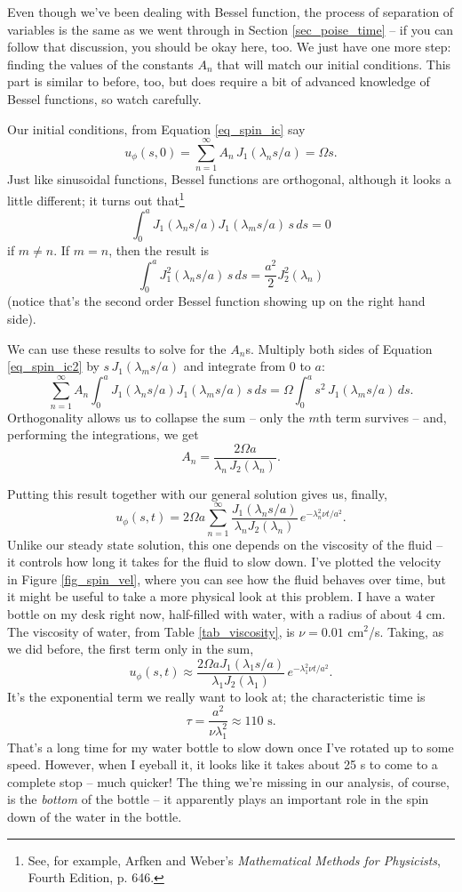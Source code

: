 Even though we've been dealing with Bessel function, the process of separation of variables is the same as we went through in Section \ref{sec_poise_time} -- if you can follow that discussion, you should be okay here, too.  We just have one more step:  finding the values of the constants $A_n$ that will match our initial conditions.  This part is similar to before, too, but does require a bit of advanced knowledge of Bessel functions, so watch carefully.

Our initial conditions, from Equation \ref{eq_spin_ic} say
\begin{equation}
\label{eq_spin_ic2}
u_\phi(s,0) =  \sum_{n=1}^\infty A_n \, J_1(\lambda_n s / a) = \Omega s.
\end{equation}
Just like sinusoidal functions, Bessel functions are orthogonal, although it looks a little different; it turns out that\footnote{See, for example, Arfken and Weber's \emph{Mathematical Methods for Physicists}, Fourth Edition, p. 646.}
\[
\int_0^a J_1(\lambda_n s / a) J_1(\lambda_m s /a) \, s\, ds = 0
\]
if $m \neq n$.  If $m = n$, then the result is
\[
\int_0^a J_1^2(\lambda_n s / a) \, s \, ds = \frac{a^2}{2} J_2^2(\lambda_n)
\]
(notice that's the second order Bessel function showing up on the right hand side).

We can use these results to solve for the $A_n$s.  Multiply both sides of Equation \ref{eq_spin_ic2} by $s \, J_1(\lambda_m s /a)$ and integrate from $0$ to $a$:
\[
\sum_{n=1}^\infty A_n \int_0^a J_1(\lambda_n s / a) J_1(\lambda_m s /a) \, s\, ds = \Omega \int_0^a s^2 \, J_1(\lambda_m s/a) \, ds.
\]
Orthogonality allows us to collapse the sum -- only the $m$th term survives -- and, performing the integrations, we get
\[
A_n = \frac{2 \Omega a}{\lambda_n \, J_2(\lambda_n)}.
\]

Putting this result together with our general solution gives us, finally,
\begin{equation}
u_\phi(s, t) = 2\Omega a \sum_{n=1}^\infty \frac{J_1(\lambda_n s/a)}{\lambda_n J_2(\lambda_n)} \, e^{-\lambda_n^2 \nu t / a^2}.
\end{equation}
Unlike our steady state solution, this one depends on the viscosity of the fluid -- it controls how long it takes for the fluid to slow down.  I've plotted the velocity in Figure \ref{fig_spin_vel}, where you can see how the fluid behaves over time, but it might be useful to take a more physical look at this problem.  I have a water bottle on my desk right now, half-filled with water, with a radius of about $4$ cm.  The viscosity of water, from Table \ref{tab_viscosity}, is $\nu = 0.01$ cm$^2$/s.  Taking, as we did before, the first term only in the sum, 
\[
u_\phi(s, t) \approx \frac{2\Omega a J_1(\lambda_1 s/a)}{\lambda_1 J_2(\lambda_1)} \, e^{-\lambda_1^2 \nu t / a^2}.
\]
It's the exponential term we really want to look at; the characteristic time is
\[
\tau = \frac{a^2}{\nu \lambda_1^2} \approx 110 \text{ s}.
\]
That's a long time for my water bottle to slow down once I've rotated up to some speed.  However, when I eyeball it, it looks like it takes about 25 s to come to a complete stop -- much quicker!  The thing we're missing in our analysis, of course, is the \emph{bottom} of the bottle -- it apparently plays an important role in the spin down of the water in the bottle.

